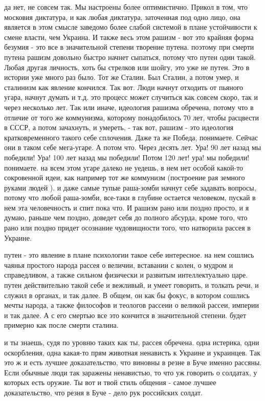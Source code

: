 да нет, не совсем так. Мы настроены более оптимистично. Прикол в том, что
московия диктатура, и как любая диктатура, заточенная под одно лицо, она
является в этом смысле заведомо более слабой системой в плане устойчивости к
смене власти, чем Украина. И также весь этом рашизм - вот это крайняя форма
безумия - это все в значительной степени творение путена. поэтому при смерти
путена рашизм довольно быстро начнет сыпаться, потому что путен один такой.
Любая другая личность, хоть бы стрелков или шойгу, это уже не путен. Это в
истории уже много раз было. Тот же Сталин. Был Сталин, а потом умер, и
сталинизм как явление кончился. Так вот. Люди начнут отходить от пьяного угара,
начнут думать и т.д. это процесс может случиться как совсем скоро, так и через
несколько лет. Так или иначе, идеология рашизма обречена, потому что в отличие
от того же коммунизма, которому понадобилось 70 лет, чтобы расцвести в СССР, а
потом зачахнуть, и умереть, - так вот, рашизм - это идеология кратковременного
такого себе сплочения. Даже та же Победа, понимаете. Сейчас они в таком себе
мега-угаре. А потом что. Через десять лет. Ура! 90 лет назад мы победили! Ура!
100 лет назад мы победили! Потом 120 лет! ура! мы победили! понимаете. на всем
этом угаре далеко не уедешь, в нем нет особой какой-то сокровенной идеи, как
например тот же коммунизм (построение рая земного руками людей ). и даже самые
тупые раша-зомби начнут себе задавать вопросы, потому что любой раша-зомби,
все-таки в глубине остается человеком, пускай в нем эта человечность и спит
пока что. И рашизм рано или поздно просто, и я думаю, раньше чем поздно,
доведет себя до полного абсурда, кроме того, что рано или поздно придет
осознание чудовищности того, что натворила рассея в Украине.

путен - это явление в плане психологии такое себе интересное. на нем сошлись
чаянья простого народа рассея о величии, вставании с колен, о мудром и
справедливом, а также сильном физически и развитым интеллектуально царе. путен
действительно такой себе и вежливый, и умеет говорить, и толкать речи, и служил
в органах, и так далее. В общем, он как бы фокус, в котором сошлись мечты
народа, а также философов и теологов рассеии о великой рассеи, империи и так
далее. А с его смертью все это кончится в значительной степени. будет примерно
как после смерти сталина.

и ты знаешь, судя по уровню таких как ты, рассея обречена. одна истерика, одни
оскорбления, одна какая-то прям животная ненависть к Украине и украинцев. Так
это ж и есть лучшее доказательство, что виновны в резне в Буче именно рассяны.
Если обычные люди так заражены ненавистью, то что уж говорить о солдатах, у
которых есть оружие. Ты вот и твой стиль общения - самое лучшее доказательство,
что резня в Буче - дело рук российских солдат.

